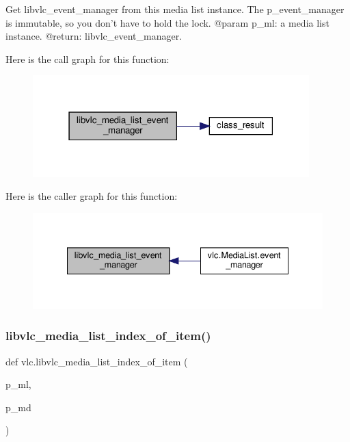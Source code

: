\begin{DoxyVerb}Get libvlc_event_manager from this media list instance.
The p_event_manager is immutable, so you don't have to hold the lock.
@param p_ml: a media list instance.
@return: libvlc_event_manager.
\end{DoxyVerb}
 Here is the call graph for this function\+:
\nopagebreak
\begin{figure}[H]
\begin{center}
\leavevmode
\includegraphics[width=303pt]{namespacevlc_a624be8eb190ea1c0d3f6b275efaa736c_cgraph}
\end{center}
\end{figure}
Here is the caller graph for this function\+:
\nopagebreak
\begin{figure}[H]
\begin{center}
\leavevmode
\includegraphics[width=335pt]{namespacevlc_a624be8eb190ea1c0d3f6b275efaa736c_icgraph}
\end{center}
\end{figure}
\mbox{\label{namespacevlc_a69f02560a16855c9e173826e68abeecb}} 
\subsubsection{\texorpdfstring{libvlc\+\_\+media\+\_\+list\+\_\+index\+\_\+of\+\_\+item()}{libvlc\_media\_list\_index\_of\_item()}}
{\footnotesize\ttfamily def vlc.\+libvlc\+\_\+media\+\_\+list\+\_\+index\+\_\+of\+\_\+item (\begin{DoxyParamCaption}\item[{}]{p\+\_\+ml,  }\item[{}]{p\+\_\+md }\end{DoxyParamCaption})}

